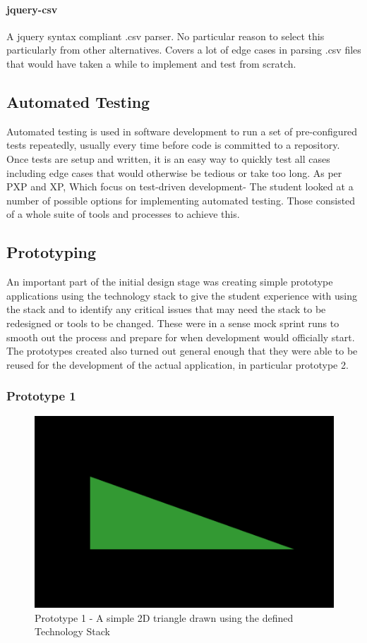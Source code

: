 \paragraph{jquery-csv}
A jquery syntax compliant .csv parser. No particular reason to select this particularly from other alternatives. Covers a lot of edge cases in parsing .csv files that would have taken a while to implement and test from scratch.

\subsection{Automated Testing} \label{automatedtests}
Automated testing is used in software development to run a set of pre-configured tests repeatedly, usually every time before code is committed to a repository. Once tests are setup and written, it is an easy way to quickly test all cases including edge cases that would otherwise be tedious or take too long. As per PXP and XP, Which focus on test-driven development- The student looked at a number of possible options for implementing automated testing. Those consisted of a whole suite of tools and processes to achieve this.

\subsection{Prototyping} \label{prototype}
An important part of the initial design stage was creating simple prototype applications using the technology stack to give the student experience with using the stack and to identify any critical issues that may need the stack to be redesigned or tools to be changed. These were in a sense mock sprint runs to smooth out the process and prepare for when development would officially start. The prototypes created also turned out general enough that they were able to be reused for the development of the actual application, in particular prototype 2.

\subsubsection {Prototype 1}
\begin{figure}[h]
    \centering
    \includegraphics[width=1\columnwidth]{author-files/figures/tri.png}
    \caption{Prototype 1 - A simple 2D triangle drawn using the defined Technology Stack}
    \label{fig:prototype1}
\end{figure}

